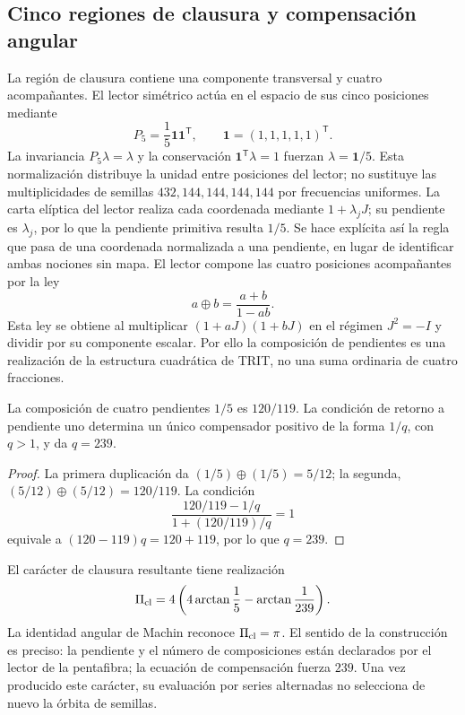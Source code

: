\subsection{Cinco regiones de clausura y compensación angular}

La región de clausura contiene una componente transversal y cuatro acompañantes. El lector simétrico actúa en el espacio de sus cinco posiciones mediante
\[
 P_5=\frac15\mathbf1\mathbf1^{\mathsf T},\qquad
 \mathbf1=(1,1,1,1,1)^{\mathsf T}.
\]
La invariancia \(P_5\lambda=\lambda\) y la conservación \(\mathbf1^{\mathsf T}\lambda=1\) fuerzan \(\lambda=\mathbf1/5\). Esta normalización distribuye la unidad entre posiciones del lector; no sustituye las multiplicidades de semillas \(432,144,144,144,144\) por frecuencias uniformes. La carta elíptica del lector realiza cada coordenada mediante \(1+\lambda_jJ\); su pendiente es \(\lambda_j\), por lo que la pendiente primitiva resulta \(1/5\). Se hace explícita así la regla que pasa de una coordenada normalizada a una pendiente, en lugar de identificar ambas nociones sin mapa. El lector compone las cuatro posiciones acompañantes por la ley
\begin{equation}
 a\oplus b=\frac{a+b}{1-ab}.
 \label{eq:suma-pendientes}
\end{equation}
Esta ley se obtiene al multiplicar \((1+aJ)(1+bJ)\) en el régimen \(J^2=-I\) y dividir por su componente escalar. Por ello la composición de pendientes es una realización de la estructura cuadrática de TRIT, no una suma ordinaria de cuatro fracciones.

\begin{proposition}
La composición de cuatro pendientes \(1/5\) es \(120/119\). La condición de retorno a pendiente uno determina un único compensador positivo de la forma \(1/q\), con \(q>1\), y da \(q=239\).
\end{proposition}
\begin{proof}
La primera duplicación da \((1/5)\oplus(1/5)=5/12\); la segunda, \((5/12)\oplus(5/12)=120/119\). La condición
\[
 \frac{120/119-1/q}{1+(120/119)/q}=1
\]
equivale a \((120-119)q=120+119\), por lo que \(q=239\).
\end{proof}

El carácter de clausura resultante tiene realización
\begin{equation}
 \Pi_{\rm cl}=4\left(4\arctan\frac15-\arctan\frac1{239}\right).
 \label{eq:lector-pi}
\end{equation}
La identidad angular de Machin reconoce \(\Pi_{\rm cl}=\pi\). El sentido de la construcción es preciso: la pendiente y el número de composiciones están declarados por el lector de la pentafibra; la ecuación de compensación fuerza \(239\). Una vez producido este carácter, su evaluación por series alternadas no selecciona de nuevo la órbita de semillas.

